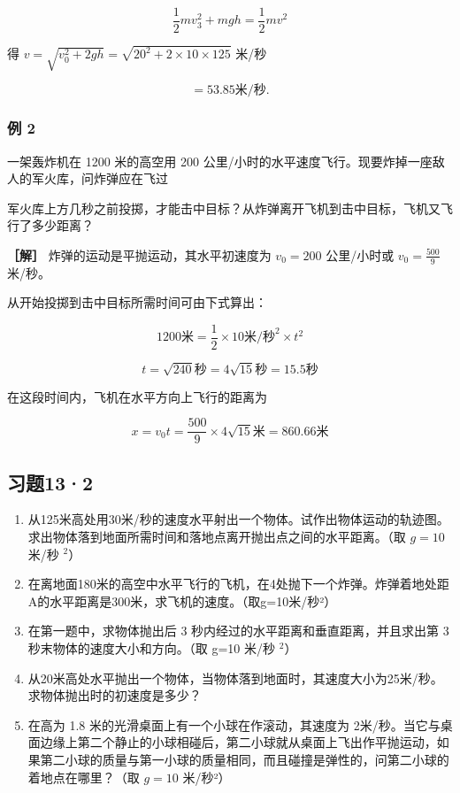 \[
\frac {1}{2} m v _ {3} ^ {2} + m g h = \frac {1}{2} m v ^ {2}
\]

得 \(v=\sqrt{v_{0}^{2}+2gh}=\sqrt{20^{2}+2\times10\times125}\) 米/秒

\[
= 53.85 \text{米} / \text{秒}.
\]

\subsubsection{例 2}\label{ux4f8b-2-13}

一架轰炸机在 1200 米的高空用 200
公里/小时的水平速度飞行。现要炸掉一座敌人的军火库，问炸弹应在飞过

军火库上方几秒之前投掷，才能击中目标？从炸弹离开飞机到击中目标，飞机又飞行了多少距离？

\textbf{［解］} 炸弹的运动是平抛运动，其水平初速度为 \(v_{0} = 200\)
公里/小时或 \(v_{0} = \frac{500}{9}\) 米/秒。

从开始投掷到击中目标所需时间可由下式算出：

\[
1200 \text{米} = \frac {1}{2} \times 10 \text{米/秒} ^ {2} \times t ^ {2}
\]

\[
t = \sqrt {240} \text{秒} = 4 \sqrt {15} \text{秒} = 15.5 \text{秒}
\]

在这段时间内，飞机在水平方向上飞行的距离为

\[
x = v _ {0} t = \frac {500}{9} \times 4 \sqrt {15} \text{米} = 860.66 \text{米}
\]

\subsection{习题13·2}\label{ux4e60ux9898132}

\begin{enumerate}
\def\labelenumi{\arabic{enumi}.}
\item
  从125米高处用30米/秒的速度水平射出一个物体。试作出物体运动的轨迹图。求出物体落到地面所需时间和落地点离开抛出点之间的水平距离。（取
  \(g=10\) 米/秒 \(^{2}\)）
\item
  在离地面180米的高空中水平飞行的飞机，在4处抛下一个炸弹。炸弹着地处距A的水平距离是300米，求飞机的速度。（取g=10米/秒²）
\item
  在第一题中，求物体抛出后 3 秒内经过的水平距离和垂直距离，并且求出第 3
  秒末物体的速度大小和方向。（取 g=10 米/秒 \(^{2}\)）
\item
  从20米高处水平抛出一个物体，当物体落到地面时，其速度大小为25米/秒。求物体抛出时的初速度是多少？
\item
  在高为 1.8 米的光滑桌面上有一个小球在作滚动，其速度为
  2米/秒。当它与桌面边缘上第二个静止的小球相碰后，第二小球就从桌面上飞出作平抛运动，如果第二小球的质量与第一小球的质量相同，而且碰撞是弹性的，问第二小球的着地点在哪里？（取
  \(g = 10\) 米/秒²）
\end{enumerate}

